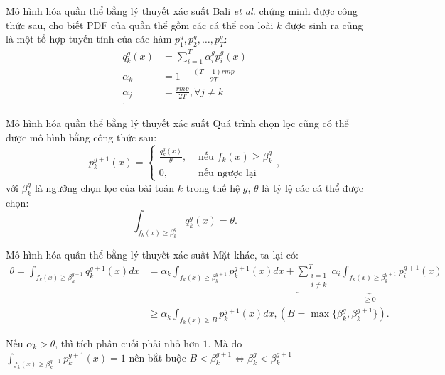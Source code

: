 \begin{frame}{Mô hình hóa quần thể bằng lý thuyết xác suất}
  Bali \textit{et al.} chứng minh được công thức sau, cho biết PDF của quần thể
  gồm các cá thể con loài \( k \) được sinh ra cũng là một tổ hợp tuyến tính của
  các hàm \( p_{1}^{g}, p_{2}^{g}, \ldots, p_{T}^{g} \):
  \begin{align*}
    q^{g}_{k}(x) &= \sum_{i = 1}^{T} \alpha_{i}^{g} p_{i}^{g}(x)\\
    \alpha_{k} &= 1- \frac{(T-1)rmp}{2T}\\
    \alpha_{j} &= \frac{rmp}{2T}, \forall j \neq  k\\
  .\end{align*}
\end{frame}
\begin{frame}{Mô hình hóa quần thể bằng lý thuyết xác suất}
  Quá trình chọn lọc cũng có thể được mô hình bằng công thức sau:
  \[
    p^{g+1}_{k}(x) = \begin{cases}
      \frac{q^{g}_{k}(x)}{\theta }, &\text{ nếu }f_{k}(x) \ge \beta^{g}_{k}\\
      0, & \text{ nếu ngược lại}
    \end{cases}
  ,\] 
  với \( \beta^{g}_{k} \) là ngưỡng chọn lọc của bài toán \( k \) trong thế hệ
  \( g \), \( \theta \) là tỷ lệ các cá thể được chọn:
  \[
    \int _{f_{k}(x) \ge \beta^{g}_{k}} q^{g}_{k}(x) = \theta
  .\] 
\end{frame}
\begin{frame}{Mô hình hóa quần thể bằng lý thuyết xác suất}
  Mặt khác, ta lại có:
  \begin{align*}
    \theta = \int _{f_{k}(x) \ge \beta^{g+1}_{k}} q^{g+1}_{k}(x)dx &= \alpha_{k}\int
    _{f_{k}(x) \ge \beta^{g+1}_{k}} p^{g+1}_{k}(x)dx + \underbrace{\sum_{\substack{i = 1\\i \neq    k}}^{T}\alpha_{i}\int
  _{f_{k}(x) \ge \beta^{g+1}_{k}} p^{g+1}_{i}(x)}_{\ge 0} \\
&\ge \alpha_{k} \int_{f_{k}(x) \ge B} p^{g+1}_{k}(x)dx, (B = \max
  \{\beta^{g}_{k}, \beta^{g+1}_{k}\}  )
  .\end{align*}

  Nếu \( \alpha_{k} > \theta \), thì tích phân cuối phải nhỏ hơn \( 1 \). Mà
  do \( \int _{f_{k}(x) \ge \beta^{g+1}_{k}} p^{g+1}_{k}(x) = 1 \) nên bắt buộc
  \( B < \beta^{g+1}_{k} \iff \boxed{\beta^{g}_{k} < \beta^{g+1}_{k}} \)
\end{frame}

